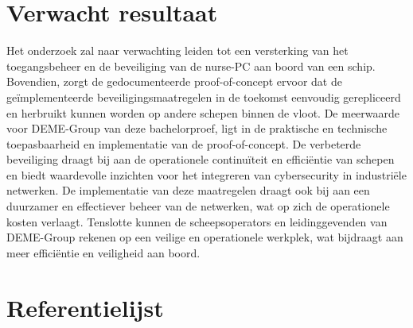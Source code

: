 \section{Verwacht resultaat}%
\label{sec:verwachte_resultaten}
Het onderzoek zal naar verwachting leiden tot een versterking van het toegangsbeheer en de beveiliging van de nurse-PC aan boord van een schip.
Bovendien, zorgt de gedocumenteerde proof-of-concept ervoor dat de geïmplementeerde beveiligingsmaatregelen in de toekomst eenvoudig gerepliceerd en herbruikt kunnen worden op andere schepen binnen de vloot.
De meerwaarde voor DEME-Group van deze bachelorproef, ligt in de praktische en technische toepasbaarheid en implementatie van de proof-of-concept. 
De verbeterde beveiliging draagt bij aan de operationele continuïteit en efficiëntie van schepen en biedt waardevolle inzichten voor het integreren van cybersecurity in industriële netwerken. 
De implementatie van deze maatregelen draagt ook bij aan een duurzamer en effectiever beheer van de netwerken, wat op zich de operationele kosten verlaagt.
Tenslotte kunnen de scheepsoperators en leidinggevenden van DEME-Group rekenen op een veilige en operationele werkplek, wat bijdraagt aan meer efficiëntie en veiligheid aan boord.


\section{Referentielijst}%
\label{sec:Referentielijst}


